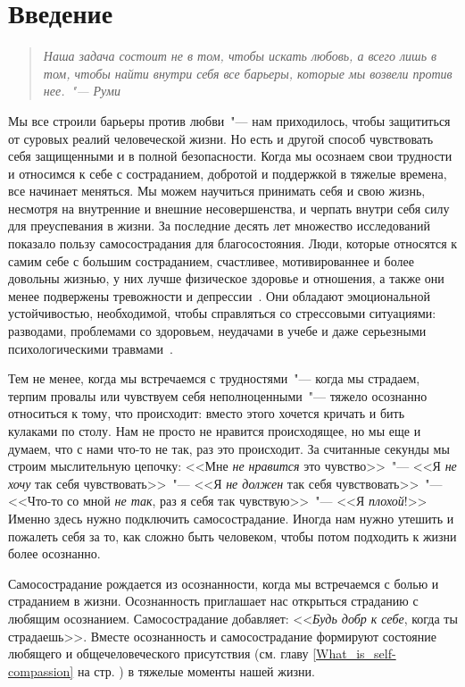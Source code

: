 
\section*{Введение} \label{Introduction}

	\begin{quote}
		\textit{
			Наша задача состоит не в том, чтобы искать любовь, а всего лишь в том, чтобы найти внутри себя все барьеры, которые мы возвели против нее.~"--- Руми 
		}\cite{1}
	\end{quote}
	
	Мы все строили барьеры против любви~"--- нам приходилось, чтобы защититься от суровых реалий человеческой жизни. Но есть и другой способ чувствовать себя защищенными и в полной безопасности. Когда мы осознаем свои трудности и относимся к себе с состраданием, добротой и поддержкой в тяжелые времена, все начинает меняться. Мы можем научиться принимать себя и свою жизнь, несмотря на внутренние и внешние несовершенства, и черпать внутри себя силу для преуспевания в жизни. За последние десять лет множество исследований показало пользу самосострадания для благосостояния. Люди, которые относятся к самим себе с большим состраданием, счастливее, мотивированнее и более довольны жизнью, у них лучше физическое здоровье и отношения, а также они менее подвержены тревожности и депрессии~\cite{2,3,4,5,6}. Они обладают эмоциональной устойчивостью, необходимой, чтобы справляться со стрессовыми ситуациями: разводами, проблемами со здоровьем, неудачами в учебе и даже серьезными психологическими травмами~\cite{7,8,9,10}. 
	
	Тем не менее, когда мы встречаемся с трудностями~"--- когда мы страдаем, терпим провалы или чувствуем себя неполноценными~"--- тяжело осознанно относиться к тому, что происходит: вместо этого хочется кричать и бить кулаками по столу. Нам не просто не нравится происходящее, но мы еще и думаем, что с нами что-то не так, раз это происходит. За считанные секунды мы строим мыслительную цепочку: <<Мне \emph{не нравится} это чувство>>~"--- <<Я \emph{не хочу} так себя чувствовать>>~"--- <<Я \emph{не должен} так себя чувствовать>>~"--- <<Что-то со мной \emph{не так}, раз я себя так чувствую>>~"--- <<Я \emph{плохой}!>> Именно здесь нужно подключить самосострадание. Иногда нам нужно утешить и пожалеть себя за то, как сложно быть человеком, чтобы потом подходить к жизни более осознанно. 
	
	Самосострадание рождается из осознанности, когда мы встречаемся с болью и страданием в жизни. Осознанность приглашает нас открыться страданию с любящим осознанием. Самосострадание добавляет: <<\emph{Будь добр к себе}, когда ты страдаешь>>. Вместе осознанность и самосострадание формируют состояние любящего и общечеловеческого присутствия (см. главу \ref{What_is_self-compassion} на стр. \pageref{What_is_self-compassion}) в тяжелые моменты нашей жизни. 
	
